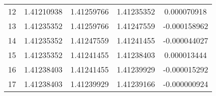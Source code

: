 \documentclass[../../../../Assignments.tex]{subfiles}
\begin{document}
\begin{solution}
\begin{enumerate}[label = (\alph*)]
\begin{longtable}{r S[table-format=1.8] S[table-format=1.8] S[table-format=1.8] S[table-format=-1.9]}
                   12  &  1.41210938   &  1.41259766   &  1.41235352   &   0.000070918  \\
                   13  &  1.41235352   &  1.41259766   &  1.41247559   &  -0.000158962  \\
                   14  &  1.41235352   &  1.41247559   &  1.41241455   &  -0.000044027  \\
                   15  &  1.41235352   &  1.41241455   &  1.41238403   &   0.000013444  \\
                   16  &  1.41238403   &  1.41241455   &  1.41239929   &  -0.000015292  \\
                   17  &  1.41238403   &  1.41239929   &  1.41239166   &  -0.000000924  \\
                \bottomrule
            \end{longtable}


\end{enumerate}
\end{solution}
\end{document}
